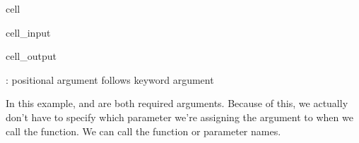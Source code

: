 \documentclass[letterpaper,10pt,english]{jupyterBook}
\begin{document}
\begin{sphinxuseclass}{cell}\begin{sphinxVerbatimInput}

\begin{sphinxuseclass}{cell_input}
\begin{sphinxVerbatim}[commandchars=\\\{\}]
      
\end{sphinxVerbatim}

\end{sphinxuseclass}\end{sphinxVerbatimInput}
\begin{sphinxVerbatimOutput}

\begin{sphinxuseclass}{cell_output}
\begin{sphinxVerbatim}[commandchars=\\\{\}]
          
: positional argument follows keyword argument
\end{sphinxVerbatim}

\end{sphinxuseclass}\end{sphinxVerbatimOutput}

\end{sphinxuseclass}
\sphinxAtStartPar
In this example, and  are both required arguments. Because of this, we actually don’t have to specify which parameter we’re assigning the argument to when we call the function. We can call the function  or  parameter names.
\end{document}
